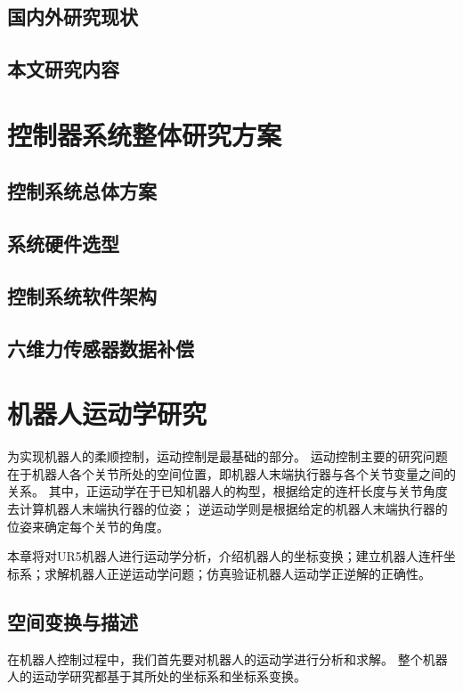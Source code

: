 \documentclass{seuthesis-2022}
\numberwithin{equation}{section}
\begin{document}
\section{国内外研究现状}



\section{本文研究内容}

\chapter{控制器系统整体研究方案}

\section{控制系统总体方案}

\section{系统硬件选型}

\section{控制系统软件架构}

\section{六维力传感器数据补偿}




\chapter{机器人运动学研究}
为实现机器人的柔顺控制，运动控制\cite{niku2020introduction}是最基础的部分。
运动控制主要的研究问题在于机器人各个关节所处的空间位置，即机器人末端执行器与各个关节变量之间的关系。
其中，正运动学在于已知机器人的构型，根据给定的连杆长度与关节角度去计算机器人末端执行器的位姿；
逆运动学则是根据给定的机器人末端执行器的位姿来确定每个关节的角度。

本章将对UR5机器人进行运动学分析，介绍机器人的坐标变换；建立机器人连杆坐标系；求解机器人正逆运动学问题；仿真验证机器人运动学正逆解的正确性。

\section{空间变换与描述}
在机器人控制过程中，我们首先要对机器人的运动学进行分析和求解。
整个机器人的运动学研究都基于其所处的坐标系和坐标系变换。
\setcounter{equation}{0}
\end{document}
